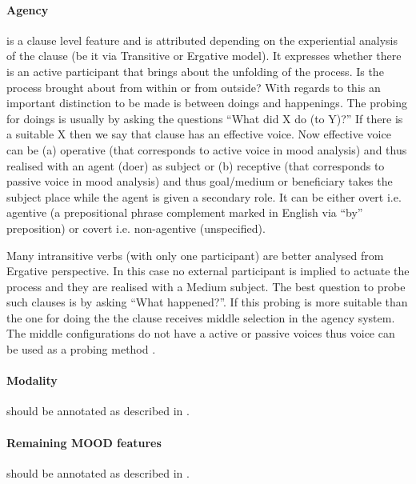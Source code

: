 \paragraph{Agency} is a clause level feature and is attributed depending on the experiential analysis of the clause (be it via Transitive or Ergative model). It expresses whether there is an active participant that brings about the unfolding of the process. Is the process brought about from within or from outside? With regards to this an important distinction to be made is between doings and happenings. The probing for doings is usually by asking the questions ``What did X do (to Y)?'' If there is a suitable X then we say that clause has an effective voice. Now effective voice can be (a) operative (that corresponds to active voice in mood analysis) and thus realised with an agent (doer) as subject or (b) receptive (that corresponds to passive voice in mood analysis) and thus goal/medium or beneficiary takes the subject place while the agent is given a secondary role. It can be either overt i.e. agentive (a prepositional phrase complement marked in English via ``by'' preposition) or covert i.e. non-agentive (unspecified).

Many intransitive verbs (with only one participant) are better analysed from Ergative perspective. In this case no external participant is implied to actuate the process and they are realised with a Medium subject. The best question to probe such clauses is by asking “What happened?”. If this probing is more suitable than the one for doing the the clause receives middle selection in the agency system. The middle configurations do not have a active or passive voices thus voice can be used as a probing method \citep[336-354]{Halliday2013}. 

\paragraph{Modality} should be annotated as described in \citet{schulz2015me}.

\paragraph{Remaining MOOD features} should be annotated as described in \citep{Halliday2013}.

